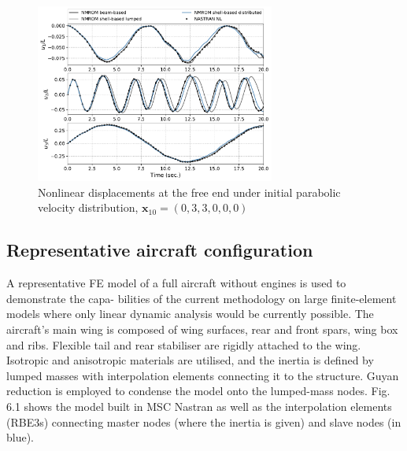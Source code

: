 \documentclass[11pt]{article}
\begin{document}
\begin{figure}[h!]
\centering
\includegraphics[width=0.7\textwidth]{./img/cantilever_solnl2}
\caption{Nonlinear displacements at the free end under initial parabolic velocity distribution, $\pmb{x}_{10} = (0,3,3,0,0,0)$}\label{fig:cantilever_solnl}
\end{figure}
%

\subsection{Representative aircraft configuration}
\label{sec:orgdbf794a}
A representative FE model of a full aircraft without engines is used to demonstrate the capa-
bilities of the current methodology on large finite-element models where only linear dynamic
analysis would be currently possible. The aircraft’s main wing is composed of wing surfaces,
rear and front spars, wing box and ribs. Flexible tail and rear stabiliser are rigidly attached to
the wing. Isotropic and anisotropic materials are utilised, and the inertia is defined by lumped
masses with interpolation elements connecting it to the structure. Guyan reduction is employed
to condense the model onto the lumped-mass nodes. Fig. 6.1 shows the model built in MSC
Nastran as well as the interpolation elements (RBE3s) connecting master nodes (where the
inertia is given) and slave nodes (in blue).
\end{document}
